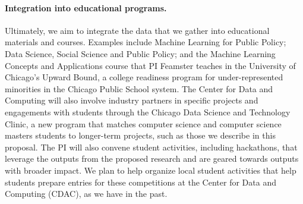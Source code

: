 \paragraph{Integration into educational programs.}
Ultimately, we aim to integrate the data that we gather into educational
materials and courses. Examples include Machine Learning for Public Policy;
Data Science, Social Science and Public Policy; and the Machine Learning
Concepts and Applications course that PI Feamster teaches in the University of
Chicago's Upward Bound, a college readiness program for under-represented
minorities in the Chicago Public School system. The Center for Data and
Computing will also involve industry partners in specific projects and
engagements with students through the Chicago Data Science and Technology
Clinic, a new program that matches computer science and computer science
masters students to longer-term projects, such as those we describe in this
proposal.
The PI will also convene student
activities, including hackathons, that leverage the outputs from the proposed
research and are geared towards outputs with broader impact.  We plan to help
organize local student activities that help students prepare
entries for these competitions at the Center for Data and Computing (CDAC), as we have in the past. 


